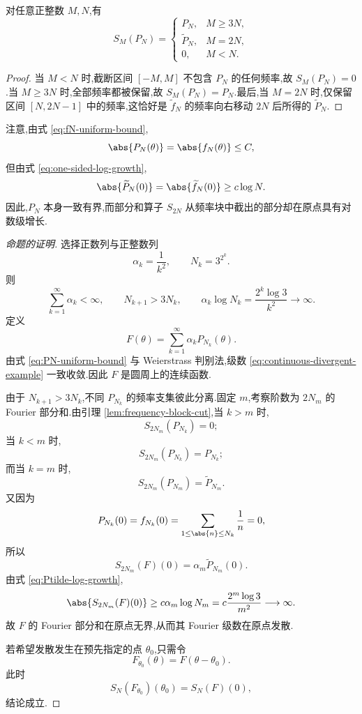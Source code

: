 \begin{lemma}\label{lem:frequency-block-cut}
	对任意正整数 $M,N$,有
	\[
	S_M(P_N)=
	\begin{cases}
		P_N,&M\geq3N,\\
		\widetilde P_N,&M=2N,\\
		0,&M<N.
	\end{cases}
	\]
\end{lemma}

\begin{proof}
	当 $M<N$ 时,截断区间 $[-M,M]$ 不包含 $P_N$ 的任何频率,故 $S_M(P_N)=0$.当 $M\geq3N$ 时,全部频率都被保留,故 $S_M(P_N)=P_N$.最后,当 $M=2N$ 时,仅保留区间 $[N,2N-1]$ 中的频率,这恰好是 $\widetilde f_N$ 的频率向右移动 $2N$ 后所得的 $\widetilde P_N$.
\end{proof}

注意,由式 \eqref{eq:fN-uniform-bound},
\begin{equation}\label{eq:PN-uniform-bound}
	\abs{P_N(\theta)}=\abs{f_N(\theta)}\leq C,
\end{equation}
但由式 \eqref{eq:one-sided-log-growth},
\begin{equation}\label{eq:Ptilde-log-growth}
	\abs{\widetilde P_N(0)}
	=
	\abs{\widetilde f_N(0)}
	\geq c\log N.
\end{equation}
因此,$P_N$ 本身一致有界,而部分和算子 $S_{2N}$ 从频率块中截出的部分却在原点具有对数级增长.



\begin{proof}[命题的证明]
	选择正数列与正整数列
	\[
	\alpha_k=\frac1{k^2},
	\qquad
	N_k=3^{2^k}.
	\]
	则
	\[
	\sum_{k=1}^{\infty}\alpha_k<\infty,
	\qquad
	N_{k+1}>3N_k,
	\qquad
	\alpha_k\log N_k
	=
	\frac{2^k\log3}{k^2}
	\longrightarrow\infty.
	\]
	定义
	\begin{equation}\label{eq:continuous-divergent-example}
		F(\theta)=\sum_{k=1}^{\infty}\alpha_kP_{N_k}(\theta).
	\end{equation}
	由式 \eqref{eq:PN-uniform-bound} 与 Weierstrass 判别法,级数 \eqref{eq:continuous-divergent-example} 一致收敛.因此 $F$ 是圆周上的连续函数.
	
	由于 $N_{k+1}>3N_k$,不同 $P_{N_k}$ 的频率支集彼此分离.固定 $m$,考察阶数为 $2N_m$ 的 Fourier 部分和.由引理 \ref{lem:frequency-block-cut},当 $k>m$ 时,
	\[
	S_{2N_m}(P_{N_k})=0;
	\]
	当 $k<m$ 时,
	\[
	S_{2N_m}(P_{N_k})=P_{N_k};
	\]
	而当 $k=m$ 时,
	\[
	S_{2N_m}(P_{N_m})=\widetilde P_{N_m}.
	\]
	又因为
	\[
	P_{N_k}(0)=f_{N_k}(0)
	=
	\sum_{1\leq\abs{n}\leq N_k}\frac1n
	=0,
	\]
	所以
	\[
	S_{2N_m}(F)(0)
	=
	\alpha_m\widetilde P_{N_m}(0).
	\]
	由式 \eqref{eq:Ptilde-log-growth},
	\[
	\abs{S_{2N_m}(F)(0)}
	\geq
	c\alpha_m\log N_m
	=
	c\frac{2^m\log3}{m^2}
	\longrightarrow\infty.
	\]
	故 $F$ 的 Fourier 部分和在原点无界,从而其 Fourier 级数在原点发散.
	
	若希望发散发生在预先指定的点 $\theta_0$,只需令
	\[
	F_{\theta_0}(\theta)=F(\theta-\theta_0).
	\]
	此时
	\[
	S_N(F_{\theta_0})(\theta_0)=S_N(F)(0),
	\]
	结论成立.
\end{proof}
